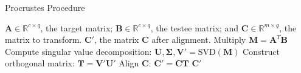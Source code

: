 \begin{algorithm}
    \caption{Procrustes Procedure}
    \label{alg:Procrustes}
    
    \begin{algorithmic}[1]
        \REQUIRE $\mathbf{A} \in \mathbb{R}^{c \times q}$, the target matrix; $\mathbf{B} \in \mathbb{R}^{c \times q}$, the testee matrix; and $\mathbf{C} \in \mathbb{R}^{m \times q}$, the matrix to transform.
        \ENSURE $\mathbf{C}'$, the matrix $\mathbf{C}$ after alignment.
        \STATE Multiply $\mathbf{M} = \mathbf{A}^T \mathbf{B}$
        \STATE Compute singular value decomposition: $\mathbf{U}, \boldsymbol{\Sigma}, \mathbf{V}' = \text{SVD}(\mathbf{M})$
        \STATE Construct orthogonal matrix: $\mathbf{T} = \mathbf{V}' \mathbf{U}'$
        \STATE Align $\mathbf{C}$: $\mathbf{C}' = \mathbf{CT}$
        \RETURN $\mathbf{C}'$
    \end{algorithmic}
\end{algorithm}